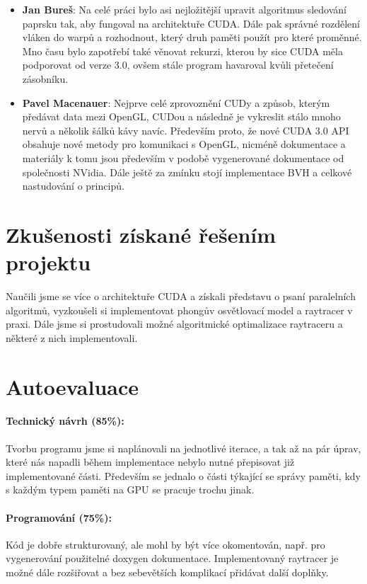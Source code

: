 \documentclass[11pt,a4paper]{article}
\begin{document}
\begin{itemize}
\item \textbf{Jan Bureš}: Na celé práci bylo asi nejložitější upravit algoritmus sledování paprsku tak, aby fungoval na architektuře CUDA. Dále pak správné rozdělení vláken do warpů a rozhodnout, který druh paměti použít pro které proměnné. Mno času bylo zapotřebí také věnovat rekurzi, kterou by sice CUDA měla podporovat od verze 3.0, ovšem stále program havaroval kvůli přetečení zásobníku.
\item \textbf{Pavel Macenauer}: Nejprve celé zprovoznění CUDy a způsob, kterým předávat data mezi OpenGL, CUDou a následně je vykreslit stálo mnoho nervů a několik šálků kávy navíc. Především proto, že nové CUDA 3.0 API obsahuje nové metody pro komunikaci s OpenGL, nicméně dokumentace a materiály k tomu jsou především v podobě vygenerované dokumentace od společnosti NVidia. Dále ještě za zmínku stojí implementace BVH a celkové nastudování o principů.
\end{itemize}
\section{Zkušenosti získané řešením projektu}

Naučili jsme se více o architektuře CUDA a získali představu o psaní paralelních algoritmů, vyzkoušeli si implementovat phongův osvětlovací model a raytracer v praxi. Dále jsme si prostudovali možné algoritmické optimalizace raytraceru a některé z nich implementovali.


\section{Autoevaluace}

\paragraph{Technický návrh (85\%):} 
Tvorbu programu jsme si naplánovali na jednotlivé iterace, a tak až na pár úprav, které nás napadli během implementace nebylo nutné přepisovat již implementované části. Především se jednalo o části týkající se správy paměti, kdy s každým typem paměti na GPU se pracuje trochu jinak.

\paragraph{Programování (75\%):}
Kód je dobře strukturovaný, ale mohl by být více okomentován, např. pro vygenerování použitelné doxygen dokumentace. 
Implementovaný raytracer je možné dále rozšiřovat a bez sebevětších komplikací přidávat další doplňky.
\end{document}
